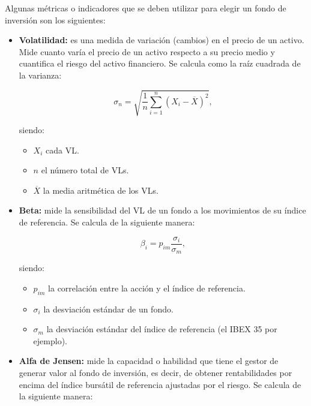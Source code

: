 \documentclass[12pt, a4paper]{book}
\begin{document}
Algunas métricas o indicadores que se deben utilizar para elegir un fondo de inversión son los siguientes:

\begin{itemize}
	\item \textbf{Volatilidad:} es una medida de variación (cambios) en el precio de un activo. Mide cuanto varía el precio de un activo respecto a su precio medio y cuantifica el riesgo del activo financiero. Se calcula como la raíz cuadrada de la varianza:
	
	\begin{center}
		\label{volatilidad}
		\begin{equation}
		\sigma _{n}={\sqrt{{\frac {1}{n}}\sum _{i=1}^{n}\left(X_{i}-{\overline {X}}\right)^{2}}},
		\end{equation}
	\end{center}
	
	siendo:
	\begin{itemize}
		\item  $X_{i}$ cada \gls{VL}.
		\item  $n$ el número total de \gls{VL}s.
		\item  $\overline {X}$ la media aritmética de los \gls{VL}s.\\
	\end{itemize}
	
	
	\item \textbf{Beta:} mide la sensibilidad del \gls{VL} de un fondo a los movimientos de su índice de referencia. Se calcula de la siguiente manera:
	
	\begin{center}
		\begin{equation}
		\beta _{i}=p_{im}\frac{\sigma _{i}}{\sigma _{m}},
		\end{equation}
	\end{center}
	
	siendo: 
	\begin{itemize}
		\item $p_{im}$ la correlación entre la acción y el índice de referencia.
		\item $\sigma _{i}$ la desviación estándar de un fondo. 
		\item $\sigma _{m} $ la desviación estándar del índice de referencia (el IBEX 35 por ejemplo).\\ 
	\end{itemize}
	
	
	\item \textbf{Alfa de Jensen:} mide la capacidad o habilidad que tiene el gestor de generar valor al fondo de inversión, es decir, de obtener rentabilidades por encima del índice bursátil de referencia ajustadas por el riesgo. Se calcula de la siguiente manera:
	

\end{itemize}
\end{document}
